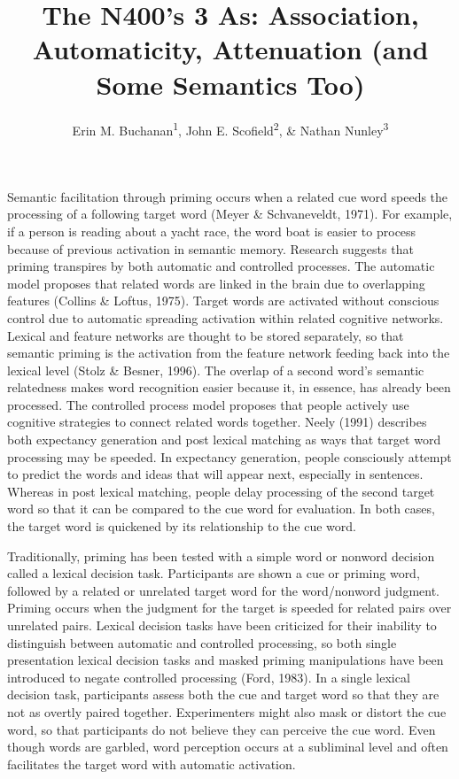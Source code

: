 \documentclass[english,man]{apa6}
\title{The N400's 3 As: Association, Automaticity, Attenuation (and Some
Semantics Too)}
\author{Erin M. Buchanan\textsuperscript{1}, John E. Scofield\textsuperscript{2}, \& Nathan Nunley\textsuperscript{3}}
\affiliation{
    \vspace{0.5cm}
          \textsuperscript{1} Missouri State University\\
          \textsuperscript{2} University of Missouri\\
          \textsuperscript{3} University of Mississippi  }
\theoremstyle{definition}
\theoremstyle{definition}
\theoremstyle{definition}
\theoremstyle{remark}
\begin{document}
\maketitle

\setcounter{secnumdepth}{0}



Semantic facilitation through priming occurs when a related cue word
speeds the processing of a following target word (Meyer \& Schvaneveldt,
1971). For example, if a person is reading about a yacht race, the word
boat is easier to process because of previous activation in semantic
memory. Research suggests that priming transpires by both automatic and
controlled processes. The automatic model proposes that related words
are linked in the brain due to overlapping features (Collins \& Loftus,
1975). Target words are activated without conscious control due to
automatic spreading activation within related cognitive networks.
Lexical and feature networks are thought to be stored separately, so
that semantic priming is the activation from the feature network feeding
back into the lexical level (Stolz \& Besner, 1996). The overlap of a
second word's semantic relatedness makes word recognition easier because
it, in essence, has already been processed. The controlled process model
proposes that people actively use cognitive strategies to connect
related words together. Neely (1991) describes both expectancy
generation and post lexical matching as ways that target word processing
may be speeded. In expectancy generation, people consciously attempt to
predict the words and ideas that will appear next, especially in
sentences. Whereas in post lexical matching, people delay processing of
the second target word so that it can be compared to the cue word for
evaluation. In both cases, the target word is quickened by its
relationship to the cue word.

Traditionally, priming has been tested with a simple word or nonword
decision called a lexical decision task. Participants are shown a cue or
priming word, followed by a related or unrelated target word for the
word/nonword judgment. Priming occurs when the judgment for the target
is speeded for related pairs over unrelated pairs. Lexical decision
tasks have been criticized for their inability to distinguish between
automatic and controlled processing, so both single presentation lexical
decision tasks and masked priming manipulations have been introduced to
negate controlled processing (Ford, 1983). In a single lexical decision
task, participants assess both the cue and target word so that they are
not as overtly paired together. Experimenters might also mask or distort
the cue word, so that participants do not believe they can perceive the
cue word. Even though words are garbled, word perception occurs at a
subliminal level and often facilitates the target word with automatic
activation.
\end{document}
